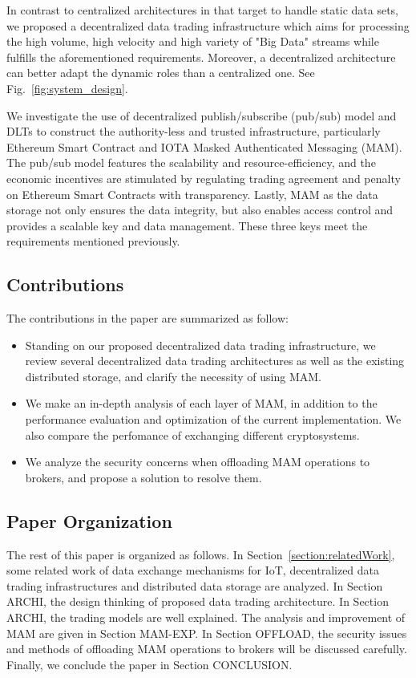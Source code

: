 \documentclass[conference]{IEEEtran}
\begin{document}
In contrast to centralized architectures in \cite{DIaas, MARSA} that target to handle static data sets, we proposed a decentralized data trading infrastructure which aims for processing the high volume, high velocity and high variety of "Big Data" streams\cite{BigData} while fulfills the aforementioned requirements. Moreover, a decentralized architecture can better adapt the dynamic roles than a centralized one. See Fig.~\ref{fig:system_design}.

We investigate the use of decentralized publish/subscribe (pub/sub) model and DLTs to construct the authority-less and trusted infrastructure, particularly Ethereum Smart Contract\cite{smartContract} and IOTA\cite{IOTAwhitepaper} Masked Authenticated Messaging (MAM)\cite{MAM}. The pub/sub model features the scalability and resource-efficiency, and the economic incentives are stimulated by regulating trading agreement and penalty on Ethereum Smart Contracts with transparency. Lastly, MAM as the data storage not only ensures the data integrity, but also enables access control and provides a scalable key and data management. These three keys meet the requirements mentioned previously.   


\subsection{Contributions}
The contributions in the paper are summarized as follow:
\begin{itemize}
	\item Standing on our proposed decentralized data trading infrastructure, we review several decentralized data trading architectures as well as the existing distributed storage, and clarify the necessity of using MAM.  
    \item We make an in-depth analysis of each layer of MAM, in addition to the performance evaluation and optimization of the current implementation. We also compare the perfomance of exchanging different cryptosystems.
	\item We analyze the security concerns when offloading MAM operations to brokers, and propose a solution to resolve them.
\end{itemize}


\subsection{Paper Organization}
The rest of this paper is organized as follows. In Section~\ref{section:relatedWork}, some related work of data exchange mechanisms for IoT, decentralized data trading infrastructures and distributed data storage are analyzed. In Section ARCHI, the design thinking of proposed data trading architecture. In Section ARCHI, the trading models are well explained. The analysis and improvement of MAM are given in Section MAM-EXP. In Section OFFLOAD, the security issues and methods of offloading MAM operations to brokers will be discussed carefully. Finally, we conclude the paper in Section CONCLUSION.
\end{document}
